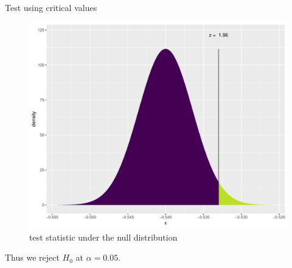 \documentclass[handout]{beamer}\usepackage[]{graphicx}\usepackage[]{color}
\newenvironment{knitrout}{}{} %
\begin{document}
\begin{frame}[fragile]{Test using critical values}
\begin{minipage}{0.47\textwidth}
\begin{knitrout}
\begin{figure}
{\centering \includegraphics[width=1\linewidth]{figure/unnamed-chunk-5-1} 

}

\caption[test statistic under the null distribution]{test statistic under the null distribution}\label{fig:unnamed-chunk-5}
\end{figure}


\end{knitrout}
\end{minipage}	
	
Thus we reject $H_0$ at $\alpha = 0.05$.
\end{frame}
\end{document}
